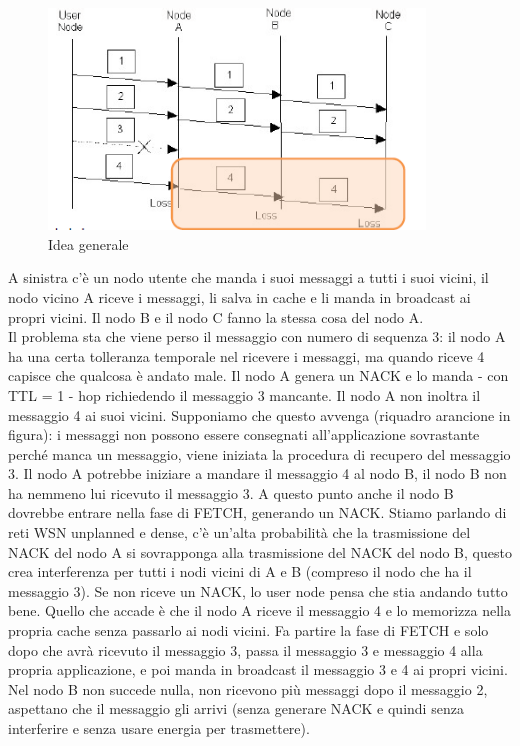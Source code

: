 \documentclass[12pt,italian]{report}
\begin{document}
\begin{figure}[h]
\centering
\includegraphics[width=100mm]{img/espsfq.PNG}
\caption{Idea generale}
\label{fig:gre}
\end{figure}
A sinistra c'è un nodo utente che manda i suoi messaggi a tutti i suoi vicini, il nodo vicino A riceve i messaggi, li salva in cache e li manda in broadcast ai propri vicini. Il nodo B e il nodo C fanno la stessa cosa del nodo A. \\ Il problema sta che viene perso il messaggio con numero di sequenza 3: il nodo A ha una certa tolleranza temporale nel ricevere i messaggi, ma quando riceve 4 capisce che qualcosa è andato male. Il nodo A genera un NACK e lo manda - con TTL = 1 - hop richiedendo il messaggio 3 mancante. 
\bigbreak
Il nodo A non inoltra il messaggio 4 ai suoi vicini. Supponiamo che questo avvenga (riquadro arancione in figura): i messaggi non possono essere consegnati all'applicazione sovrastante perché manca un messaggio, viene iniziata la procedura di recupero del messaggio 3. Il nodo A potrebbe iniziare a mandare il messaggio 4 al nodo B, il nodo B non ha nemmeno lui ricevuto il messaggio 3. A questo punto anche il nodo B dovrebbe entrare nella fase di FETCH, generando un NACK. 
\bigbreak
Stiamo parlando di reti WSN unplanned e dense, c'è un'alta probabilità che la trasmissione del NACK del nodo A si sovrapponga alla trasmissione del NACK del nodo B, questo crea interferenza per tutti i nodi vicini di A e B (compreso il nodo che ha il messaggio 3). Se non riceve un NACK, lo user node pensa che stia andando tutto bene. 
\bigbreak
Quello che accade è che il nodo A riceve il messaggio 4 e lo memorizza nella propria cache senza passarlo ai nodi vicini. Fa partire la fase di FETCH e solo dopo che avrà ricevuto il messaggio 3, passa il messaggio 3 e messaggio 4 alla propria applicazione, e poi manda in broadcast il messaggio 3 e 4 ai propri vicini. Nel nodo B non succede nulla, non ricevono più messaggi dopo il messaggio 2, aspettano che il messaggio gli arrivi (senza generare NACK e quindi senza interferire e senza usare energia per trasmettere). 
\end{document}
